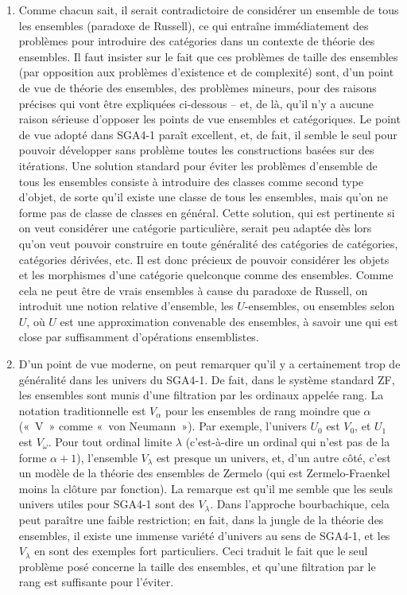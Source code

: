 \documentclass[10pt]{fichiers-configuration-latex/smfart}
\begin{document}
\begin{enumerate}
\item Comme chacun sait, il serait contradictoire de considérer
un ensemble de tous les ensembles (paradoxe de Russell), ce
qui entraîne immédiatement des problèmes pour introduire des
catégories dans un contexte de théorie des ensembles. Il
faut insister sur le fait que ces problèmes de taille des
ensembles  (par opposition aux problèmes d'existence et de
complexité) sont, d'un point de vue de théorie des
ensembles, des problèmes mineurs, pour des raisons précises
qui vont être expliquées ci-dessous -- et, de là, qu'il n'y
a aucune raison sérieuse d'opposer les points de vue
ensembles et catégoriques. Le point de vue adopté dans
SGA4-1 paraît excellent, et, de fait, il semble le seul pour
pouvoir développer sans problème toutes les constructions
basées sur des itérations. Une solution standard pour éviter
les problèmes d'ensemble de tous les ensembles consiste à
introduire des classes comme second type d'objet, de sorte
qu'il existe une classe de tous les ensembles, mais qu'on ne
forme pas de classe de classes en général.
Cette solution, qui est pertinente si on veut considérer une
catégorie particulière, serait peu adaptée dès lors qu'on
veut pouvoir construire en toute généralité des catégories
de catégories, catégories dérivées, etc. Il est donc
précieux de pouvoir considérer les objets et les morphismes
d'une catégorie quelconque comme des ensembles. Comme cela
ne peut être de vrais ensembles à cause du paradoxe de
Russell, on introduit une notion relative d'ensemble, les
$U$-ensembles, ou ensembles selon $U$, où $U$ est une
approximation convenable des ensembles, à savoir une qui est
close par suffisamment d'opérations ensemblistes.

\item D'un point de vue moderne, on peut remarquer qu'il y a
certainement trop de généralité dans les univers du SGA4-1.
De fait, dans le système standard ZF, les ensembles sont
munis d'une filtration par les ordinaux appelée rang. La
notation traditionnelle est $V_\alpha$ pour les ensembles de
rang moindre que $\alpha$ (« V » comme « von Neumann »). Par
exemple, l'univers $U_0$ est $V_0$, et $U_1$ est $V_\omega$.
Pour tout ordinal limite $\lambda$ (c'est-à-dire un ordinal
qui n'est pas de la forme $\alpha + 1$), l'ensemble
$V_\lambda$ est presque un univers, et, d'un autre côté,
c'est un modèle de la théorie des ensembles de Zermelo (qui
est Zermelo-Fraenkel moins la clôture par fonction). La
remarque est qu'il me semble que les seuls univers utiles
pour SGA4-1 sont des $V_\lambda$. Dans l'approche
bourbachique, cela peut paraître une faible restriction; en
fait, dans la jungle de la théorie des ensembles, il existe
une immense variété d'univers au sens de SGA4-1, et les
$V_\lambda$ en sont des exemples fort particuliers. Ceci
traduit le fait que le seul problème posé concerne la taille
des ensembles, et qu'une filtration par le rang est
suffisante pour l'éviter. 


\end{enumerate}
\end{document}
